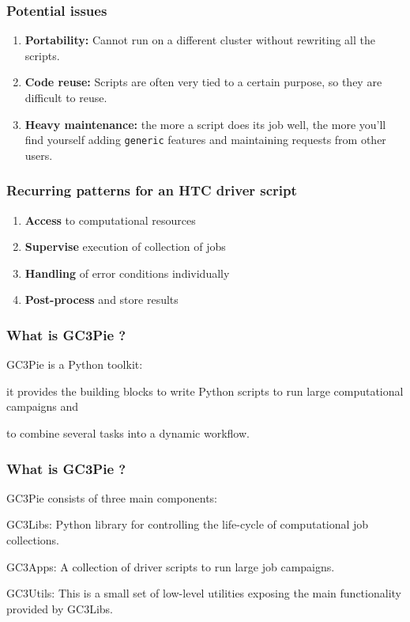 \documentclass[english,serif,mathserif,xcolor=pdftex,dvipsnames,table]{beamer}
\begin{document}
\begin{frame}
  \frametitle{Potential issues}
  \begin{enumerate}
  \item \textbf{Portability:} Cannot run on a different cluster without
    rewriting all the scripts.
  \item \textbf{Code reuse:} Scripts are often very tied to a certain purpose, so
    they are difficult to reuse.
  \item \textbf{Heavy maintenance:} the more a script does its job well, the more
    you'll find yourself adding \texttt{generic} features and maintaining
    requests from other users.
  \end{enumerate}
\end{frame}

\begin{frame}
  \frametitle{Recurring patterns for an HTC driver script}
  \begin{enumerate}
  \item{\textbf{Access}} to computational resources
  \item{\textbf{Supervise}} execution of collection of jobs
  \item{\textbf{Handling}} of error conditions individually
  \item{\textbf{Post-process}} and store results
  \end{enumerate}
\end{frame}

\begin{frame}
\frametitle{What is GC3Pie ?}
  \begin{block}{}
    GC3Pie is a {\color{Blue} Python} toolkit:
  \end{block}

  \begin{block}{}
    it provides the building blocks to write Python scripts to run large {\color{Blue} computational campaigns} and 
  \end{block}

  \begin{block}{}
    to {\color{Blue} combine} several tasks into a dynamic
    {\color{Blue} workflow}.
  \end{block}
\end{frame}

\begin{frame}
\frametitle{What is GC3Pie ?}

  GC3Pie consists of three main components:
  
  \begin{block}{GC3Libs:} Python library for controlling the life-cycle of computational job collections. \end{block}
  \begin{block}{GC3Apps:} A collection of driver scripts to run large job campaigns. \end{block}
  \begin{block}{GC3Utils:} This is a small set of low-level utilities exposing the main functionality provided by GC3Libs. \end{block}
\end{frame}
\end{document}
